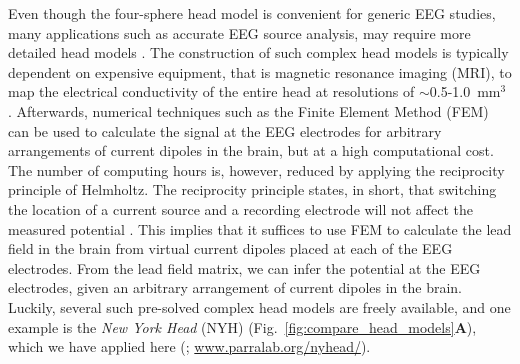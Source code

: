 \documentclass[preprint,10pt,authoryear]{elsarticle}
\newcommand{\hlb}[2][NavyBlue]{ {\sethlcolor{#1} \hl{#2}} }
\newcommand{\hlg}[2][Emerald]{ {\sethlcolor{#1} \hl{#2}} }
\newcommand{\hlp}[2][Purple]{ {\sethlcolor{#1} \hl{#2}} }
\newcommand{\snnote}[1]{\color{white}{\hlb{SN: #1 }}\color{black}}
\newcommand{\sntxt}[1]{{\color{NavyBlue}#1}}
\newcommand{\tvnnote}[1]{\color{white}{\hlg{TVN: #1 }}\color{black}}
\newcommand{\gen}[1]{\color{white}{\hlp{GTE: #1 }}\color{black}}
\begin{document}
Even though the four-sphere head model is convenient for generic EEG studies, many applications such as accurate EEG source analysis, may require more detailed head models \citep{DALE1999, VORWERK2014}.
The construction of such \sntxt{complex} head models is typically dependent on expensive equipment, %
that is magnetic resonance imaging (MRI), to map the electrical conductivity of the entire head at resolutions of $\sim$0.5-1.0~mm$^3$
\citep{HUANG2015, HUANG2016}. Afterwards, numerical techniques such as the Finite Element Method (FEM) \citep{LOGG2012} can be used to calculate the signal at the EEG electrodes for arbitrary arrangements of current dipoles in the brain, but at a high computational cost.
The number of computing hours is, however, reduced by applying the reciprocity principle of Helmholtz. The reciprocity principle states, in short, that switching the location of a current source and a recording electrode will not affect the measured potential \citep{Malmivuo1995, Ziegler2014, HUANG2016, Dmochowski2017}. %
 This implies that it suffices to use FEM to calculate the lead field in the brain from virtual current dipoles placed at each of the EEG electrodes. From the lead field matrix, we can infer the potential at the EEG electrodes, given an arbitrary arrangement of current dipoles in the brain.
Luckily, %
several such pre-solved complex head models are freely available, and one example is the {\it New York Head} (NYH) (Fig.~\ref{fig:compare_head_models}\textbf{A}), which we have applied here (\cite{HUANG2016}; \url{www.parralab.org/nyhead/}).
\end{document}
